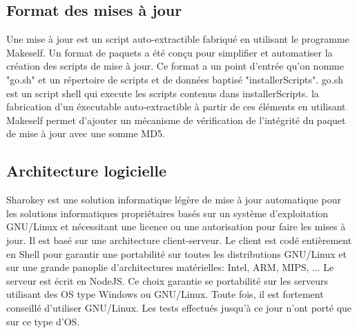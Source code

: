 \documentclass{themeensg}
\begin{document}
\subsection{Format des mises à jour}

Une mise à jour est un script auto-extractible fabriqué en utilisant le programme Makeself. Un format de paquets a été conçu pour simplifier et automatiser la création des scripts de mise à jour. Ce format a un point d'entrée qu'on nomme "go.sh" et un répertoire de scripts et de données baptisé "installerScripts". go.sh est un script shell qui execute les scripts contenus dans installerScripts. la fabrication d'un éxecutable auto-extractible à partir de ces éléments en utilisant Makeself permet d'ajouter un mécanisme de vérification de l'intégrité du paquet de mise à jour avec une somme MD5.

\subsection{Architecture logicielle}
Sharokey est une solution informatique légère de mise à jour automatique pour les solutions informatiques propriétaires basés sur un système d'exploitation GNU/Linux et nécessitant une licence ou une autorisation pour faire les mises à jour. Il est basé sur une architecture client-serveur. Le client est codé entièrement en Shell pour garantir une portabilité sur toutes les distributions GNU/Linux et sur une grande panoplie d'architectures matérielles: Intel, ARM, MIPS, ... Le serveur est écrit en NodeJS. Ce choix garantie se portabilité sur les serveurs utilisant des OS type Windows ou GNU/Linux. Toute fois, il est fortement conseillé d'utiliser GNU/Linux. Les tests effectués jusqu'à ce jour n'ont porté que sur ce type d'OS.
\end{document}
